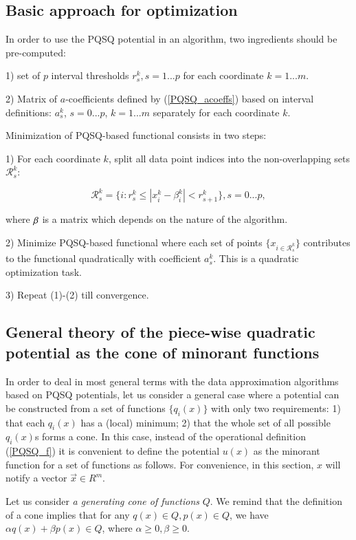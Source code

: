\documentclass[preprint,12pt,twocolumn]{elsarticle}
\begin{document}
\subsection{Basic approach for optimization}

In order to use the PQSQ potential in an algorithm, two ingredients should be pre-computed:

1) set of $p$ interval thresholds $r_s^k, s=1...p$ for each coordinate $k=1...m$.

2) Matrix of $a$-coefficients defined by (\ref{PQSQ_acoeffs}) based on interval definitions: $a_s^k$, $s=0...p$, $k=1...m$ separately for each coordinate $k$.

Minimization of PQSQ-based functional consists in two steps:

1) For each coordinate $k$, split all data point indices into the non-overlapping sets $\mathcal{R}_s^k$:

\begin{equation}
\mathcal{R}_s^k= \{i: r_{s}^k \leq |x_i^k-\beta^k_i| < r_{s+1}^k\}, s = 0...p,
\end{equation}

\noindent where $\bf{\beta}$ is a matrix which depends on the nature of the algorithm.

2) Minimize PQSQ-based functional where each set of points $\{x_{i\in \mathcal{R}_s^k}\}$ contributes
to the functional quadratically with coefficient $a_s^k$. This is a quadratic optimization task.

3) Repeat (1)-(2) till convergence.

\subsection{General theory of the piece-wise quadratic potential as the cone of minorant functions}\label{ConvergenceSection}

In order to deal in most general terms with the data approximation algorithms based on PQSQ potentials, let us consider a general case where a potential can be constructed from a set of functions $\{q_i(x)\}$ with only two requirements: 1) that each $q_i(x)$ has a (local) minimum; 2) that the whole set of all possible $q_i(x)$s forms a cone. In this case, instead of the operational definition (\ref{PQSQ_f}) it is convenient to define the potential $u(x)$ as the minorant function for a set of functions as follows. For convenience, in this section, $x$ will notify a vector $\vec{x}\in R^m$.

Let us consider {\it a generating cone of functions} $Q$. We remind that the definition of a cone implies that for any $q(x)\in Q, p(x)\in Q$, we have $\alpha q(x)+\beta p(x)\in Q$, where $\alpha\geq 0, \beta \geq 0$.
\end{document}
